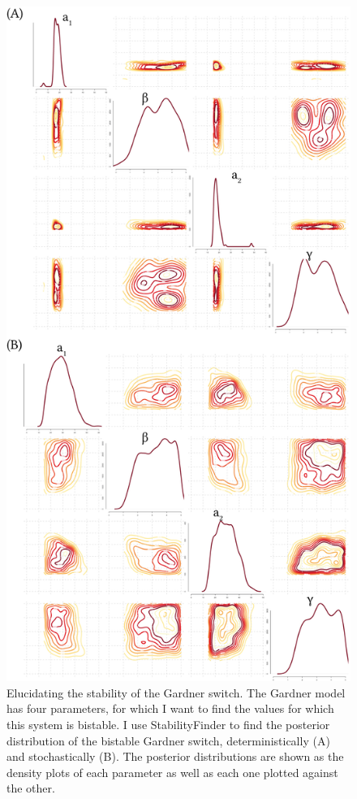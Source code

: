 \begin{figure}[htbp]
\begin{center}
	\includegraphics[scale=0.8]{../../chapters/chapterStabilityFinder/images/gardner_posterior_w.png}
	\caption[The posterior distributions of the bistable Gardner toggle switch]{\label{fig:gard_post} Elucidating the stability of the Gardner switch. The Gardner model has four parameters, for which I want to find the values for which this system is bistable. I use StabilityFinder to find the posterior distribution of the bistable Gardner switch, deterministically (A) and stochastically (B). The posterior distributions are shown as the density plots of each parameter as well as each one plotted against the other.  }
\end{center}
\end{figure}
